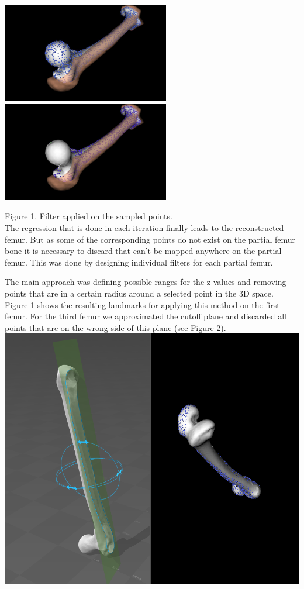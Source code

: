 \documentclass{article}
\begin{document}
	\includegraphics[width=7.3cm]{1.jpg} \includegraphics[width=7.3cm]{2.jpg}
	
	Figure 1. Filter applied on the sampled points.\\
	
	The regression that is done in each iteration finally leads to the reconstructed femur. But as some of the corresponding points do not exist on the partial femur bone it is necessary to discard that can’t be mapped anywhere on the partial femur. This was done by designing individual filters for each partial femur. 
	
	The main approach was defining possible ranges for the z values and removing points that are in a certain radius around a selected point in the 3D space. Figure 1 shows the resulting landmarks for applying this method on the first femur. For the third femur we approximated the cutoff plane and discarded all points that are on the wrong side of this plane (see Figure 2).\\
	
	\includegraphics[width=14cm]{4.png}
	
\end{document}
